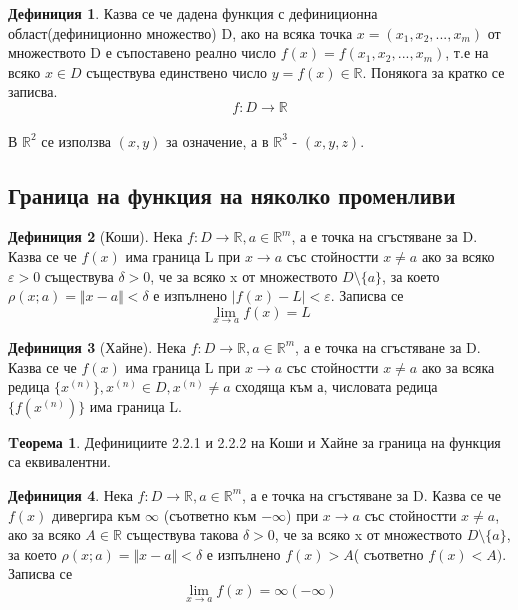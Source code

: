 \documentclass[a4paper,fleqn,12pt]{article}
\theoremstyle{definition}
\newtheorem{theorem}{Tеорема}[subsection]
\newtheorem{definition}{Дефиниция}[subsection]
\begin{document}
\begin{definition}
Казва се че дадена функция с дефиниционна област(дефиниционно множество) D, ако на всяка точка $x = (x_1, x_2, ... , x_m)$ от множеството D е съпоставено реално число $f(x) = f(x_1, x_2, ... , x_m)$, т.е на всяко $x \in D$ съществува единствено число $y = f(x) \in \mathbb{R}$. Понякога за кратко се записва. 
$$f: D \to \mathbb{R} $$\\
В $\mathbb{R}^2$ се използва $(x,y)$ за означение, а в $\mathbb{R}^3$ - $(x,y,z)$.
\end{definition}

\subsection{Граница на функция на няколко променливи}

\begin{definition}[Коши]
Нека $f: D \to \mathbb{R}, a \in \mathbb{R}^m$, а е точка на сгъстяване за D. Казва се че $f(x)$ има граница L при $x \to a$ със стойностти $x \neq a$ ако за всяко $\varepsilon > 0$ съществува $\delta > 0$, че за всяко x от множеството $D \setminus \{a\}$, за което $\rho(x;a) = \Vert x - a \Vert < \delta $ е изпълнено $\vert f(x) - L \vert  < \varepsilon$. Записва се $$\lim\limits_{x \to a} f(x) = L$$
\end{definition}

\begin{definition}[Хайне]
Нека $f: D \to \mathbb{R}, a \in \mathbb{R}^m$, а е точка на сгъстяване за D. Казва се че $f(x)$ има граница L при $x \to a$ със стойностти $x \neq a$ ако за всяка редица  $\{x^{(n)}\} ,x^{(n)} \in D, x^{(n)} \neq a$ сходяща към а, числовата редица $\{f(x^{(n)})\}$ има граница L. 
\end{definition}

\begin{theorem}
Дефинициите 2.2.1 и 2.2.2 на Коши и Хайне за граница на функция са еквивалентни.
\end{theorem}

\begin{definition}
Нека $f: D \to \mathbb{R}, a \in \mathbb{R}^m$, а е точка на сгъстяване за D. Казва се че $f(x)$ дивергира към $\infty$ (съответно към $-\infty$) при $x \to a$ със стойностти $x \neq a$, ако за всяко $A \in \mathbb{R}$ съществува такова $\delta > 0$, че за всяко x от множеството $D \setminus \{a\}$, за което $\rho(x;a) = \Vert x - a \Vert < \delta $ е изпълнено $f(x) > A $( съответно $f(x) < A)$. Записва се
 $$\lim\limits_{x \to a} f(x) = \infty (-\infty) $$ 
\end{definition}
\end{document}
